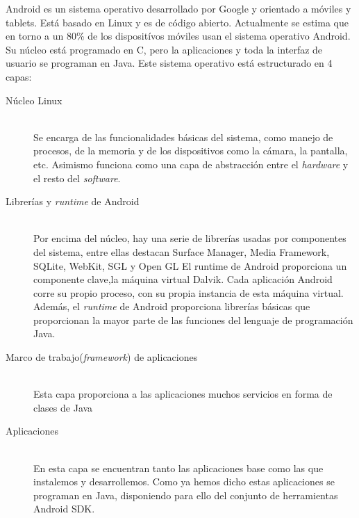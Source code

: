 \documentclass[a4paper,openright, 12pt]{book}
\begin{document}
Android es un sistema operativo desarrollado por Google y orientado a móviles y tablets. Está basado en Linux y es de código abierto. Actualmente se estima que en torno a un 80\% de los dispositívos móviles usan el sistema operativo Android.
Su núcleo está programado en C, pero la aplicaciones y toda la interfaz de usuario se programan en Java.
Este sistema operativo está estructurado en 4 capas:
\begin{description}
  \item[Núcleo Linux] \hfill \\
  Se encarga de las funcionalidades básicas del sistema, como manejo de procesos, de la memoria y de los dispositivos como la cámara, la pantalla, etc.
   Asimismo funciona como una capa de abstracción entre el \textit{hardware} y el resto del \textit{software}.
   
  \item[Librerías y \textit{runtime} de Android] \hfill \\
  Por encima del núcleo, hay una serie de librerías usadas por componentes del sistema, entre ellas destacan Surface Manager, Media Framework, SQLite, WebKit, SGL y Open GL
  \newline
  El runtime de Android proporciona un componente clave,la máquina virtual Dalvik. Cada aplicación Android corre su propio proceso, con su propia instancia de esta máquina virtual.
  Además, el \textit{runtime} de Android proporciona librerías básicas que proporcionan la mayor parte de las funciones del lenguaje de programación Java.
  
  \item[Marco de trabajo(\textit{framework}) de aplicaciones] \hfill \\
  Esta capa proporciona a las aplicaciones muchos servicios en forma de clases de Java 
  
   \item[Aplicaciones] \hfill \\
  En esta capa se encuentran tanto las aplicaciones base como las que instalemos y desarrollemos. Como ya hemos dicho estas aplicaciones se programan en Java, disponiendo para ello del conjunto de herramientas Android SDK.
\end{description}
\end{document}
